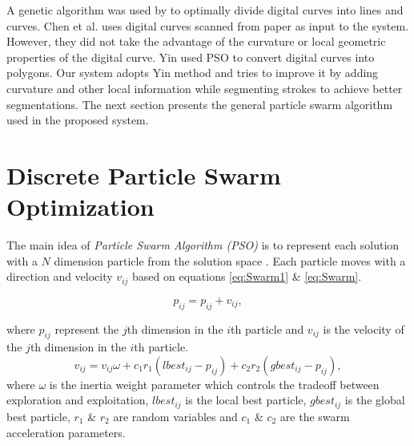 \documentclass[preprint,10pt,5p,twocolumn]{elsarticle}
\begin{document}
A genetic algorithm was used by \cite{CruveDivisionSwarm} to optimally divide digital curves into lines and curves. Chen et al. \cite{CruveDivisionSwarm} uses digital curves scanned from paper as input to the system. However, they did not take the advantage of the curvature or local geometric properties of the digital curve. Yin \cite{PolygonApproximationPSO} used PSO to convert digital curves into polygons. Our system adopts Yin \cite{PolygonApproximationPSO} method and tries to improve it by adding curvature and other local information while segmenting strokes to achieve better segmentations. The next section presents the general particle swarm algorithm used in the proposed system.


\section{Discrete Particle Swarm Optimization}
\label{sec:ParticleSwarmAlgorithm}
 The main idea of \textit{Particle Swarm Algorithm (PSO)} is to represent each solution with a $N$ dimension particle from the solution space \cite{PSOFirst}. Each particle moves with a direction and velocity $v_{ij}$ based on equations \ref{eq:Swarm1} \& \ref{eq:Swarm}.

\begin{equation}
p_{ij}=p_{ij}+v_{ij},
\label{eq:Swarm1}
\end{equation}
 
where $p_{ij}$ represent the $j$th dimension in the $i$th particle and $v_{ij}$ is the velocity of the $j$th dimension in the $i$th particle.
 \begin{equation}
v_{ij}  = v_{ij} \omega + c_1 r_1 (lbest_{ij}  - p_{ij} ) + c_2 r_2 (gbest_{ij}  - p_{ij} ),
\label{eq:Swarm}
\end{equation}
 where $\omega$ is the inertia weight parameter which controls the tradeoff between exploration and exploitation,  $lbest_{ij}$ is the local best particle, $gbest_{ij}$ is the global best particle, $r_1$ \& $r_2$ are random variables and $c_1$ \& $c_2$ are the swarm acceleration parameters.
\end{document}
